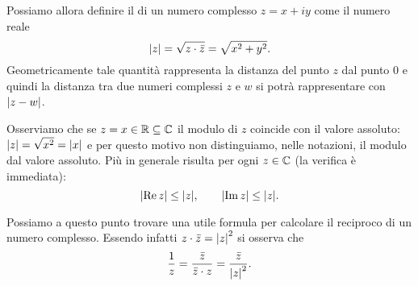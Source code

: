 Possiamo allora definire il
 di un numero complesso $z=x+iy$
come il numero reale
\[
{\left|z\right|} = \sqrt{z\cdot\bar z} = \sqrt{x^2+y^2}.
\]
Geometricamente tale quantità rappresenta la distanza del punto $z$
dal punto $0$ e quindi la distanza tra due numeri complessi $z$ e
$w$ si potrà rappresentare con ${\left|z-w\right|}$.

Osserviamo che se $z = x \in \mathbb R \subseteq \mathbb C$ il modulo di $z$ coincide
con il valore assoluto: ${\left|z\right|} = \sqrt{x^2} = {\left|x\right|}$ e per questo
motivo non distinguiamo, nelle notazioni, il modulo dal valore assoluto.
Più in generale risulta per ogni $z\in \mathbb C$ (la verifica è immediata):
\[
  {\left|\operatorname{Re} z\right|} \le {\left|z\right|}, \qquad
  {\left|\operatorname{Im}z\right|} \le {\left|z\right|}.
\]

Possiamo a questo punto trovare una utile formula per calcolare
il reciproco di un numero complesso. Essendo infatti
$z\cdot \bar z = {\left|z\right|}^2$ si osserva che
\[
  \frac{1}{z}
  = \frac{\bar z}{ \bar z \cdot z}
  = \frac{\bar z}{{\left|z\right|}^2}.
\]

